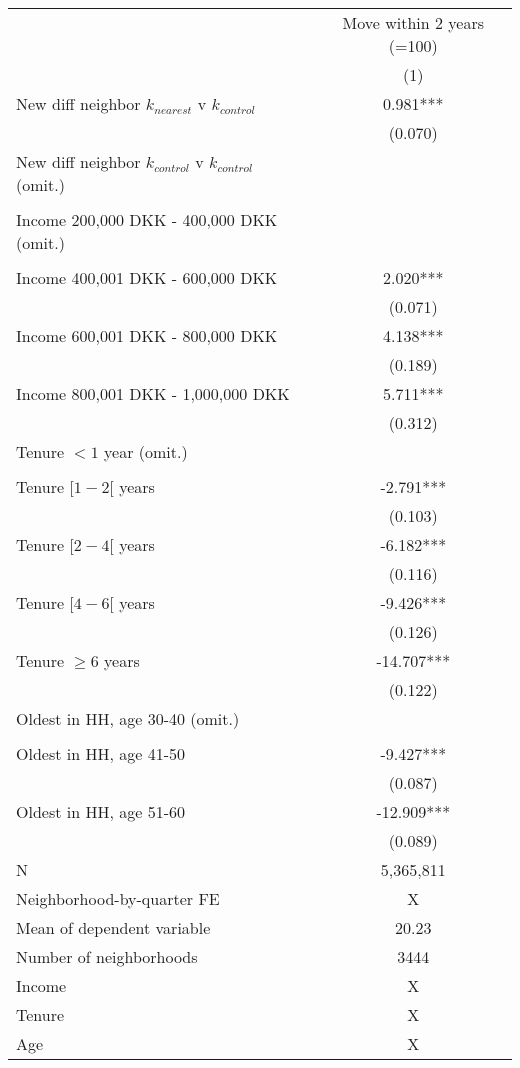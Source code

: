 \begin{tabular}{lc}
\toprule
 & Move within 2 years (=100) \\ 
\cmidrule(lr){2-2}
  & (1) \\ 
\midrule
New diff neighbor $k_{nearest}$ v $k_{control}$ & 0.981*** \\ 
 & (0.070) \\ 
New diff neighbor $k_{control}$ v $k_{control}$ (omit.) & \\ 
 &   \\ 
 Income 200,000 DKK - 400,000 DKK (omit.) &  \\ 
 & \\ 
Income 400,001 DKK - 600,000 DKK & 2.020*** \\ 
 & (0.071) \\ 
Income 600,001 DKK - 800,000 DKK & 4.138*** \\ 
 & (0.189) \\ 
Income 800,001 DKK - 1,000,000 DKK & 5.711*** \\ 
 & (0.312) \\ 
 Tenure $<1$ year (omit.) &  \\ 
 &  \\ 
Tenure $[1-2[$ years & -2.791*** \\ 
 & (0.103) \\ 
Tenure $[2-4[$ years & -6.182*** \\ 
 & (0.116) \\ 
Tenure $[4-6[$ years & -9.426*** \\ 
 & (0.126) \\ 
Tenure $\geq 6$ years & -14.707*** \\ 
 & (0.122) \\ 
 Oldest in HH, age 30-40 (omit.) &  \\ 
 & \\ 
Oldest in HH, age 41-50 & -9.427*** \\ 
 & (0.087) \\ 
Oldest in HH, age 51-60 & -12.909*** \\ 
 & (0.089) \\ 
 \midrule
N & 5,365,811 \\ 
Neighborhood-by-quarter FE & X \\ 
Mean of dependent variable & 20.23 \\ 
Number of neighborhoods & 3444 \\ 
Income & X \\ 
Tenure & X \\ 
Age & X \\ 
\bottomrule
\end{tabular}
